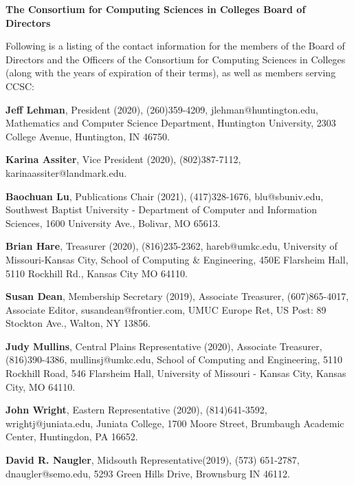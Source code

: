 \documentclass{article}
\begin{document}
\begingroup
  \centering
  \textbf{\LARGE The Consortium for Computing Sciences in Colleges Board of Directors}\par
\endgroup

\begin{footnotesize}
\begin{multicols}{2}
\begin{raggedright}

\noindent
Following is a listing of the contact information for the members of the Board
of Directors and the Officers of the Consortium for Computing Sciences in
Colleges (along with the years of expiration of their terms), as well as members
serving CCSC:

\vspace{0.1in}
\noindent
\textbf{Jeff Lehman}, President (2020), (260)359-4209, jlehman@huntington.edu,
Mathematics and Computer Science Department, Huntington University, 2303
College Avenue, Huntington, IN 46750.

\noindent
\textbf{Karina Assiter}, Vice President (2020), (802)387-7112,
karinaassiter@landmark.edu.

\noindent
\textbf{Baochuan Lu}, Publications Chair (2021), (417)328-1676,
blu@sbuniv.edu, Southwest Baptist University - Department of Computer and
Information Sciences, 1600 University Ave., Bolivar, MO 65613.

\noindent
\textbf{Brian Hare}, Treasurer (2020), (816)235-2362, hareb@umkc.edu,
University of Missouri-Kansas City, School of Computing \& Engineering, 450E
Flarsheim Hall, 5110 Rockhill Rd., Kansas City MO 64110.

\noindent
\textbf{Susan Dean}, Membership Secretary (2019), Associate Treasurer,
(607)865-4017, Associate Editor, susandean@frontier.com, UMUC Europe Ret,
US Post: 89 Stockton Ave., Walton, NY 13856.

\noindent
\textbf{Judy Mullins}, Central Plains Representative (2020), Associate Treasurer,
(816)390-4386, mullinsj@umkc.edu, School of Computing and Engineering, 5110
Rockhill Road, 546 Flarsheim Hall, University of Missouri - Kansas City,
Kansas City, MO 64110.

\noindent
\textbf{John Wright}, Eastern Representative (2020), (814)641-3592,
wrightj@juniata.edu, Juniata College, 1700 Moore Street, Brumbaugh Academic
Center, Huntingdon, PA 16652.

\noindent
\textbf{David R. Naugler}, Midsouth Representative(2019), (573) 651-2787,
dnaugler@semo.edu, 5293 Green Hills Drive, Brownsburg IN 46112.


\end{raggedright}
\end{multicols}
\end{footnotesize}
\end{document}
